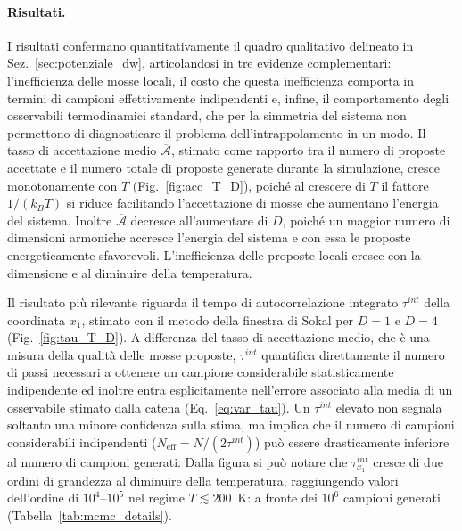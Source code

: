 \paragraph*{Risultati.}
I risultati confermano quantitativamente il quadro qualitativo delineato in Sez.~\ref{sec:potenziale_dw}, articolandosi in tre evidenze complementari: l'inefficienza delle mosse locali, il costo che questa inefficienza comporta in termini di campioni effettivamente indipendenti e, infine, il comportamento degli osservabili termodinamici standard, che per la simmetria del sistema non permettono di diagnosticare il problema dell'intrappolamento in un modo.
Il tasso di accettazione medio $\overline{\mathcal{A}}$, stimato come rapporto tra il numero di proposte accettate e il numero totale di proposte generate durante la simulazione, cresce monotonamente con $T$ (Fig.~\ref{fig:acc_T_D}), poiché al crescere di $T$ il fattore $1/(k_BT)$ si riduce facilitando l'accettazione di mosse che aumentano l'energia del sistema. Inoltre $\overline{\mathcal{A}}$ decresce all'aumentare di $D$, poiché un maggior numero di dimensioni armoniche accresce l'energia del sistema e con essa le proposte energeticamente sfavorevoli. L'inefficienza delle proposte locali cresce con la dimensione e al diminuire della temperatura.

Il risultato più rilevante riguarda il tempo di autocorrelazione integrato $\tau^{int}$ della coordinata $x_1$, stimato con il metodo della finestra di Sokal per $D=1$ e $D=4$ (Fig.~\ref{fig:tau_T_D}). A differenza del tasso di accettazione medio, che è una misura della qualità delle mosse proposte, $\tau^{int}$ quantifica direttamente il numero di passi necessari a ottenere un campione considerabile statisticamente indipendente ed inoltre entra esplicitamente nell'errore associato alla media di un osservabile stimato dalla catena (Eq.~\ref{eq:var_tau}). Un $\tau^{int}$ elevato non segnala soltanto una minore confidenza sulla stima, ma implica che il numero di campioni considerabili indipendenti ($N_{\text{eff}} = N/(2\tau^{int})$) può essere drasticamente inferiore al numero di campioni generati. Dalla figura si può notare che $\tau^{int}_{x_1}$ cresce di due ordini di grandezza al diminuire della temperatura, raggiungendo valori dell'ordine di $10^4$--$10^5$ nel regime $T\lesssim 200$~K: a fronte dei $10^6$ campioni generati (Tabella~\ref{tab:mcmc_details}).

